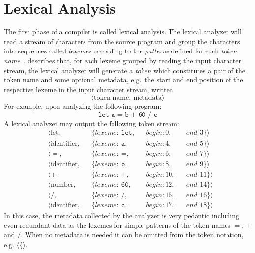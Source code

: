 \documentclass[
  oneside,
  english,
  coorientadorbanca,
  noabntexcite
]{ufsc-thesis-rn46-2019}
\newcommand{\code}[1]{\texttt{#1}}
\newcommand{\token}[1]{$\langle\code{#1}\rangle$}
\begin{document}
\section{Lexical Analysis}\label{chapter:background:sec:lexical}

The first phase of a compiler is called lexical analysis.
The lexical analyzer will read a stream of characters from the source program and group the characters into sequences called \textit{lexemes} according to the \textit{patterns} defined for each \textit{token name}~\cite{Aho:2006:CPT:1177220}.
\textcite{Aho:2006:CPT:1177220} describes that, for each lexeme grouped by reading the input character stream, the lexical analyzer will generate a \textit{token} which constitutes a pair of the token name and some optional metadata, e.g.\ the start and end position of the respective lexeme in the input character stream, written
\begin{equation*}
  \langle \textrm{token name},\ \textrm{metadata}\rangle
\end{equation*}
For example, upon analyzing the following program:
\begin{equation*}
  \code{let a = b + 60 / c}
\end{equation*}
A lexical analyzer may output the following token stream:
\begin{equation}\label{figure:introduction_token_stream}
  \begin{aligned}
     & \langle \textrm{let},        &  & \{lexeme:\ \code{let}, &  & begin: 0,  &  & end: 3\}\rangle  \\
     & \langle \textrm{identifier}, &  & \{lexeme:\ \code{a},   &  & begin: 4,  &  & end: 5\}\rangle  \\
     & \langle =,                   &  & \{lexeme:\ \code{=},   &  & begin: 6,  &  & end: 7\}\rangle  \\
     & \langle \textrm{identifier}, &  & \{lexeme:\ \code{b},   &  & begin: 8,  &  & end: 9\}\rangle  \\
     & \langle +,                   &  & \{lexeme:\ \code{+},   &  & begin: 10, &  & end: 11\}\rangle \\
     & \langle \textrm{number},     &  & \{lexeme:\ \code{60},  &  & begin: 12, &  & end: 14\}\rangle \\
     & \langle /,                   &  & \{lexeme:\ \code{/},   &  & begin: 15, &  & end: 16\}\rangle \\
     & \langle \textrm{identifier}, &  & \{lexeme:\ \code{c},   &  & begin: 17, &  & end: 18\}\rangle
  \end{aligned}
\end{equation}
In this case, the metadata collected by the analyzer is very pedantic including even redundant data as the lexemes for simple patterns of the token names $=$, $+$ and $/$.
When no metadata is needed it can be omitted from the token notation, e.g. \token{\{}.
\end{document}
